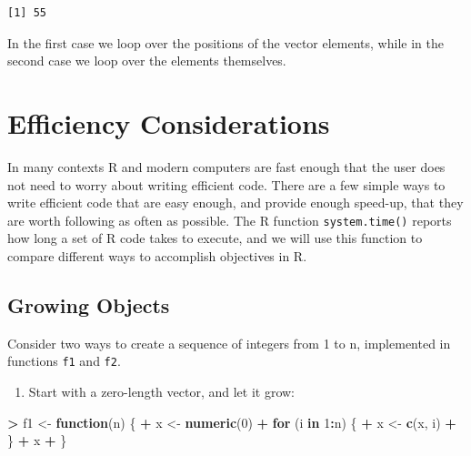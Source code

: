 \documentclass[]{krantz}
\makeatletter
\newenvironment{Shaded}{\begin{snugshade}}{\end{snugshade}}
\newcommand{\ControlFlowTok}[1]{\textcolor[rgb]{0.27,0.27,0.27}{\textbf{#1}}}
\newcommand{\DecValTok}[1]{\textcolor[rgb]{0.06,0.06,0.06}{#1}}
\newcommand{\KeywordTok}[1]{\textcolor[rgb]{0.27,0.27,0.27}{\textbf{#1}}}
\newcommand{\NormalTok}[1]{#1}
\newcommand{\OperatorTok}[1]{\textcolor[rgb]{0.43,0.43,0.43}{\textbf{#1}}}
\newcommand{\StringTok}[1]{\textcolor[rgb]{0.5,0.5,0.5}{#1}}
\providecommand{\tightlist}{%
  \setlength{\itemsep}{0pt}\setlength{\parskip}{0pt}}
\newenvironment{kframe}{%
\medskip{}
\setlength{\fboxsep}{.8em}
 \def\at@end@of@kframe{}%
 \ifinner\ifhmode%
  \def\at@end@of@kframe{\end{minipage}}%
  \begin{minipage}{\columnwidth}%
 \fi\fi%
 \def\FrameCommand##1{\hskip\@totalleftmargin \hskip-\fboxsep
 \colorbox{shadecolor}{##1}\hskip-\fboxsep
     \hskip-\linewidth \hskip-\@totalleftmargin \hskip\columnwidth}%
 \MakeFramed {\advance\hsize-\width
   \@totalleftmargin\z@ \linewidth\hsize
   \@setminipage}}%
 {\par\unskip\endMakeFramed%
 \at@end@of@kframe}
\renewenvironment{Shaded}{\begin{kframe}}{\end{kframe}}
\makeatother
\begin{document}
\begin{verbatim}
[1] 55
\end{verbatim}

In the first case we loop over the positions of the vector elements, while in the second case we loop over the elements themselves.

\hypertarget{efficiency-considerations}{%
\section{Efficiency Considerations}\label{efficiency-considerations}}

In many contexts R and modern computers are fast enough that the user does not need to worry about writing efficient code. There are a few simple ways to write efficient code that are easy enough, and provide enough speed-up, that they are worth following as often as possible. The R function \texttt{system.time()} reports how long a set of R code takes to execute, and we will use this function to compare different ways to accomplish objectives in R.

\hypertarget{growing-objects}{%
\subsection{Growing Objects}\label{growing-objects}}

Consider two ways to create a sequence of integers from 1 to n, implemented in functions \texttt{f1} and \texttt{f2}.

\begin{enumerate}
\def\labelenumi{\arabic{enumi}.}
\tightlist
\item
  Start with a zero-length vector, and let it grow:
\end{enumerate}

\begin{Shaded}
\begin{Highlighting}[]
\OperatorTok{>}\StringTok{ }\NormalTok{f1 <-}\StringTok{ }\ControlFlowTok{function}\NormalTok{(n) \{}
\OperatorTok{+}\StringTok{   }\NormalTok{x <-}\StringTok{ }\KeywordTok{numeric}\NormalTok{(}\DecValTok{0}\NormalTok{)}
\OperatorTok{+}\StringTok{   }\ControlFlowTok{for}\NormalTok{ (i }\ControlFlowTok{in} \DecValTok{1}\OperatorTok{:}\NormalTok{n) \{}
\OperatorTok{+}\StringTok{     }\NormalTok{x <-}\StringTok{ }\KeywordTok{c}\NormalTok{(x, i)}
\OperatorTok{+}\StringTok{   }\NormalTok{\}}
\OperatorTok{+}\StringTok{   }\NormalTok{x}
\OperatorTok{+}\StringTok{ }\NormalTok{\}}
\end{Highlighting}
\end{Shaded}
\end{document}
